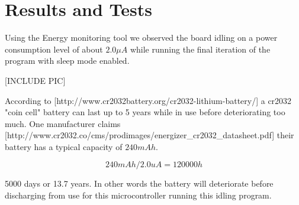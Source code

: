 \chapter{Results and Tests}

Using the Energy monitoring tool we observed the board idling on a power consumption level of about
$2.0 \mu A$ while running the final iteration of the program with sleep mode enabled.

[INCLUDE PIC]

According to [http://www.cr2032battery.org/cr2032-lithium-battery/] a cr2032 "coin cell" battery can
last up to 5 years while in use before deteriorating too much. One manufacturer claims
[http://www.cr2032.co/cms/prodimages/energizer\_cr2032\_datasheet.pdf] their battery has a typical capacity of $240 mAh$.

\[
	240 mAh / 2.0 uA = 120 000 h
\]

5000 days or 13.7 years. In other words the battery will deteriorate before discharging from use for this microcontroller running this idling program.
